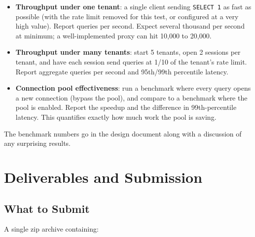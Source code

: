 \documentclass[11pt,a4paper]{article}
\begin{document}
\begin{itemize}
\item \textbf{Throughput under one tenant}: a single client sending \texttt{SELECT 1} as fast as possible (with the rate limit removed for this test, or configured at a very high value). Report queries per second. Expect several thousand per second at minimum; a well-implemented proxy can hit 10{,}000 to 20{,}000.

\item \textbf{Throughput under many tenants}: start 5 tenants, open 2 sessions per tenant, and have each session send queries at 1/10 of the tenant's rate limit. Report aggregate queries per second and 95th/99th percentile latency.

\item \textbf{Connection pool effectiveness}: run a benchmark where every query opens a new connection (bypass the pool), and compare to a benchmark where the pool is enabled. Report the speedup and the difference in 99th-percentile latency. This quantifies exactly how much work the pool is saving.
\end{itemize}

The benchmark numbers go in the design document along with a discussion of any surprising results.

\section{Deliverables and Submission}

\subsection{What to Submit}
A single zip archive containing:
\end{document}
